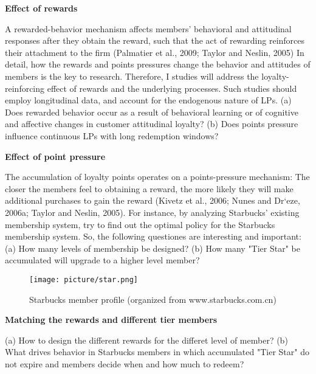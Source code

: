 \documentclass[12pt]{article}
\begin{document}
\begin{spacing}{1.5}
{\bfseries\sffamily Effect of rewards}

A rewarded-behavior mechanism affects members’ behavioral and attitudinal responses after they obtain the reward, such that the act of rewarding reinforces their attachment to the firm (Palmatier et al., 2009; Taylor and Neslin, 2005)\cite{palmatier2009role}\cite{taylor2005current}
In detail, how the rewards and points pressures change the behavior and attitudes of members is the key to research. Therefore, I studies will address the loyalty-reinforcing effect of rewards and the underlying processes. Such studies should employ longitudinal data, and account for the endogenous nature of LPs. (a) Does rewarded behavior occur as a result of behavioral learning or of cognitive and affective changes in customer attitudinal loyalty? (b) Does points pressure influence continuous LPs with long redemption windows? 

{\bfseries\sffamily Effect of point pressure}

The accumulation of loyalty points operates on a points-pressure mechanism: The closer the members feel to obtaining a reward, the more likely they will make additional purchases to gain the reward (Kivetz et al., 2006; Nunes and Dr`eze, 2006a; Taylor and Neslin, 2005)\cite{kivetz2006goal}\cite{nunes2006endowed}\cite{taylor2005current}.
For instance, by analyzing Starbucks' existing membership system, try to find out the optimal policy for the Starbucks membership system. So, the following questiones are interesting and important: (a) How many levels of membership be designed? (b) How many "Tier Star" be accumulated will upgrade to a higher level member? 


\begin{figure}[ht]
\centering
\texttt{[image: picture/star.png]}
\caption{Starbucks member profile (organized from www.starbucks.com.cn)}
\label{fig:label}
\end{figure}

{\bfseries\sffamily Matching the rewards and different tier members}

(a) How to design the different rewards for the differet level of member? (b) What drives behavior in Starbucks members in which accumulated "Tier Star" do not expire and members decide when and how much to redeem? 



\end{spacing}
\end{document}
